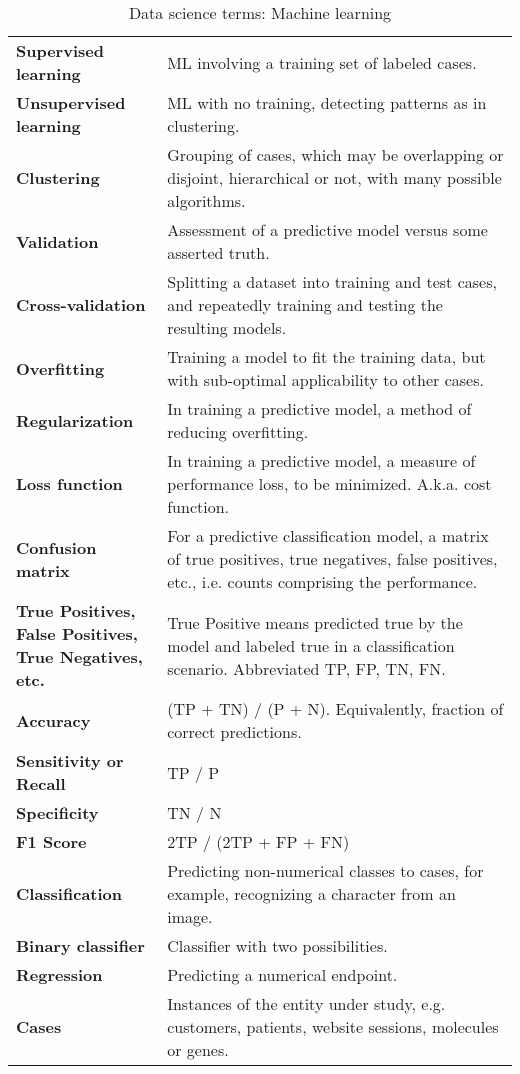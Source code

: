 \begin{appendices}
\begin{table}
\caption{Data science terms: Machine learning}
\begin{tabular}{p{0.3\linewidth}p{0.7\linewidth}}
\hline
\textbf{Supervised learning} & ML involving a training set of labeled cases. \\
\textbf{Unsupervised learning} & ML with no training, detecting patterns as in clustering. \\
\textbf{Clustering} & Grouping of cases, which may be overlapping or disjoint, hierarchical or not, with many possible algorithms. \\
\textbf{Validation} & Assessment of a predictive model versus some asserted truth. \\
\textbf{Cross-validation} & Splitting a dataset into training and test cases, and repeatedly training and testing the resulting models. \\
\textbf{Overfitting} & Training a model to fit the training data, but with sub-optimal applicability to other cases. \\
\textbf{Regularization} & In training a predictive model, a method of reducing overfitting. \\
\textbf{Loss function} & In training a predictive model, a measure of performance loss, to be minimized.  A.k.a. cost function. \\
\textbf{Confusion matrix} & For a predictive classification model, a matrix of true positives, true negatives, false positives, etc., i.e. counts comprising the performance. \\
\textbf{True Positives, False Positives, True Negatives, etc.} & True Positive means predicted true by the model and labeled true in a classification scenario.  Abbreviated TP, FP, TN, FN. \\
\textbf{Accuracy} & (TP + TN) / (P + N).  Equivalently, fraction of correct predictions. \\
\textbf{Sensitivity or Recall} & TP / P \\
\textbf{Specificity} & TN / N \\
\textbf{F1 Score} & 2TP / (2TP + FP + FN) \\
\textbf{Classification} & Predicting non-numerical classes to cases, for example, recognizing a character from an image. \\
\textbf{Binary classifier} & Classifier with two possibilities. \\
\textbf{Regression} & Predicting a numerical endpoint. \\
\textbf{Cases} & Instances of the entity under study, e.g. customers, patients, website sessions, molecules or genes. \\

\end{tabular}
\end{table}
\end{appendices}
